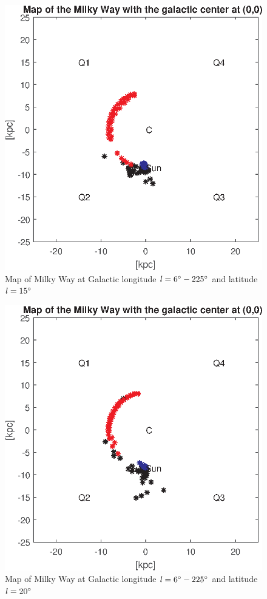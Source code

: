 \documentclass[fleqn,usenatbib]{mnras}
\begin{document}
\begin{figure}
      \includegraphics[width=\columnwidth]{Map_4}
      \caption{Map of Milky Way at Galactic longitude $\mathit{l}=6\hbox{$^\circ$}-225\hbox{$^\circ$}$ and latitude $\mathit{l}=15\hbox{$^\circ$}$}
      \label{fig:map-4}
\end{figure}

\begin{figure}
      \includegraphics[width=\columnwidth]{Map_5}
      \caption{Map of Milky Way at Galactic longitude $\mathit{l}=6\hbox{$^\circ$}-225\hbox{$^\circ$}$ and latitude $\mathit{l}=20\hbox{$^\circ$}$}
      \label{fig:map-5}
\end{figure}
\end{document}
